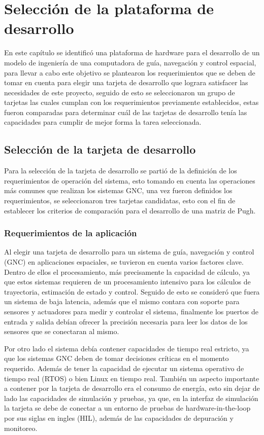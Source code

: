 \chapter{Selección de la plataforma de desarrollo}
\label{ch:especifico1}

En este capítulo se identificó una plataforma de hardware para el desarrollo de un modelo de ingeniería de una computadora de guía, navegación y control espacial, para llevar a cabo este objetivo se plantearon los requerimientos que se deben de tomar en cuenta para elegir una tarjeta de desarrollo que lograra satisfacer las necesidades de este proyecto, seguido de esto se seleccionaron un grupo de tarjetas las cuales cumplan con los requerimientos previamente establecidos, estas fueron comparadas para determinar cuál de las tarjetas de desarrollo tenía las capacidades para cumplir de mejor forma la tarea seleccionada.

\section{Selección de la tarjeta de desarrollo}
    Para la selección de la tarjeta de desarrollo se partió de la definición de los requerimientos de operación del sistema, esto tomando en cuenta las operaciones más comunes que realizan los sistemas GNC, una vez fueron definidos los requerimientos, se seleccionaron tres tarjetas candidatas, esto con el fin de establecer los criterios de comparación para el desarrollo de una matriz de Pugh.

\subsection{Requerimientos de la aplicación}

Al elegir una tarjeta de desarrollo para un sistema de guía, navegación y control (GNC) en aplicaciones espaciales, se tuvieron en cuenta varios factores clave. Dentro de ellos el procesamiento, más precisamente la capacidad de cálculo, ya que estos sistemas requieren de un procesamiento intensivo para los cálculos de trayectoria, estimación de estado y control. Seguido de esto se consideró que fuera un sistema de baja latencia, además que el mismo contara con soporte para sensores y actuadores para medir y controlar el sistema, finalmente los puertos de entrada y salida debían ofrecer la precisión necesaria para leer los datos de los sensores que se conectaran al mismo.

Por otro lado el sistema debía contener capacidades de tiempo real estricto, ya que los sistemas GNC deben de tomar decisiones críticas en el momento requerido. Además de tener la capacidad de ejecutar un sistema operativo de tiempo real (RTOS) o bien Linux en tiempo real. También un aspecto importante a contener por la tarjeta de desarrollo era el consumo de energía, esto sin dejar de lado las capacidades de simulación y pruebas, ya que, en la interfaz de simulación la tarjeta se debe de conectar a un entorno de pruebas de hardware-in-the-loop por sus siglas en ingles (HIL), además de las capacidades de depuración y monitoreo.

